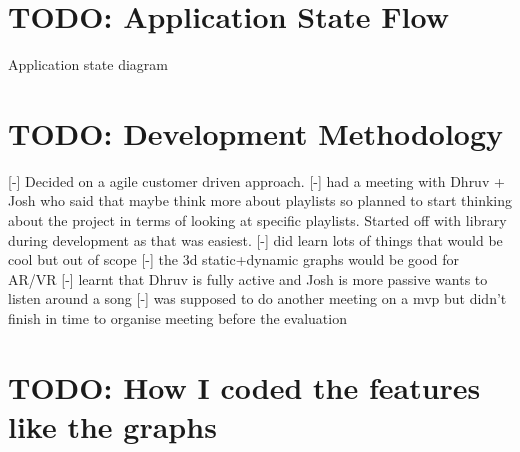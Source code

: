 \section{TODO: Application State Flow}
Application state diagram

\section{TODO: Development Methodology}
[-] Decided on a agile customer driven approach.
[-] had a meeting with Dhruv + Josh who said that maybe think more about playlists so planned to start thinking about the project in terms of looking at specific playlists. Started off with library during development as that was easiest.
[-] did learn lots of things that would be cool but out of scope
    [-] the 3d static+dynamic graphs would be good for AR/VR
    [-] learnt that Dhruv is fully active and Josh is more passive wants to listen around a song
[-] was supposed to do another meeting on a mvp but didn't finish in time to organise meeting before the evaluation

\section{TODO: How I coded the features like the graphs}

